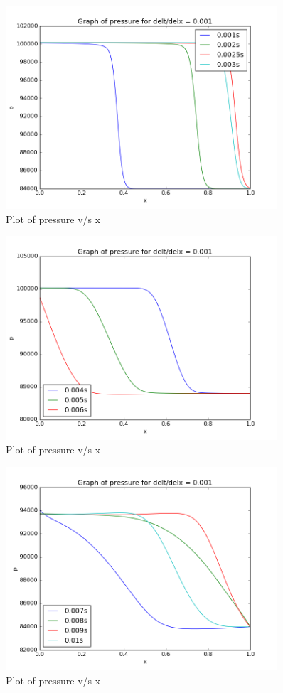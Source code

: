 \documentclass[11pt, a4paper]{article}
\begin{document}
\begin{figure}[H]
 \centering
 \includegraphics[width = 0.9\textwidth]{lax_fed_3_7.png}
 \caption{Plot of pressure v/s x}
\end{figure}
\begin{figure}[H]
 \centering
 \includegraphics[width = 0.9\textwidth]{lax_fed_3_8.png}
 \caption{Plot of pressure v/s x}
\end{figure}
\begin{figure}[H]
 \centering
 \includegraphics[width = 0.9\textwidth]{lax_fed_3_9.png}
 \caption{Plot of pressure v/s x}
\end{figure}
\end{document}
